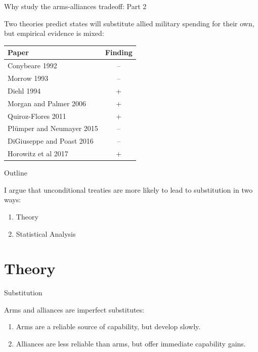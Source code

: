 \documentclass{beamer}
\begin{document}
\begin{frame}{Why study the arms-alliances tradeoff: Part 2}

Two theories predict states will substitute allied military spending for their own, but empirical evidence is mixed:

\pause

\begin{tabular}{lc}
Paper & Finding \\
\hline
Conybeare 1992 & --  \\
Morrow 1993 & -- \\
\pause 
Diehl 1994 & + \\
Morgan and Palmer 2006 & + \\ 
\pause 
Quiroz-Flores 2011 & + \\ 
Pl{\"u}mper and Neumayer 2015 & -- \\
\pause 
DiGiuseppe and Poast 2016 & -- \\ 
Horowitz et al 2017 & + \\ 

\end{tabular}




 \end{frame}



\begin{frame}{Outline}

I argue that unconditional treaties are more likely to lead to substitution in two ways: 

\pause

\begin{enumerate}
\item Theory
\pause
\item Statistical Analysis
\end{enumerate}




 \end{frame}


\section{Theory}


\begin{frame}{Substitution}

\pause

Arms and alliances are imperfect substitutes: 
\pause 
\begin{enumerate}
\item Arms are a reliable source of capability, but develop slowly. 
\pause 
\item Alliances are less reliable than arms, but offer immediate capability gains. 
\end{enumerate} 
\pause 

\end{frame}
\end{document}
